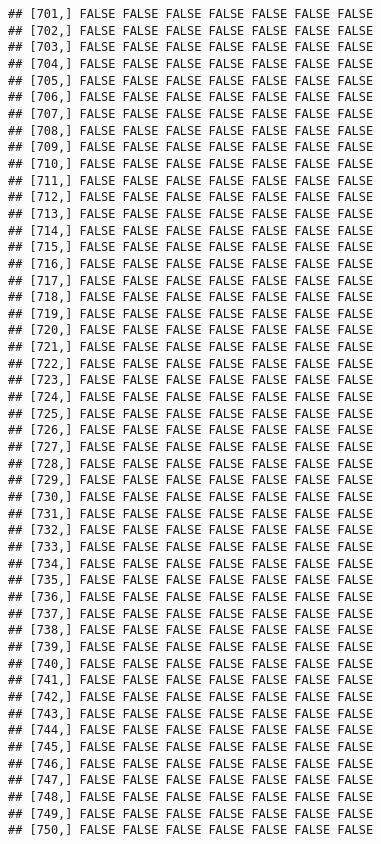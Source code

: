 \documentclass[
]{article}
\begin{document}
\begin{verbatim}
## [701,] FALSE FALSE FALSE FALSE FALSE FALSE FALSE
## [702,] FALSE FALSE FALSE FALSE FALSE FALSE FALSE
## [703,] FALSE FALSE FALSE FALSE FALSE FALSE FALSE
## [704,] FALSE FALSE FALSE FALSE FALSE FALSE FALSE
## [705,] FALSE FALSE FALSE FALSE FALSE FALSE FALSE
## [706,] FALSE FALSE FALSE FALSE FALSE FALSE FALSE
## [707,] FALSE FALSE FALSE FALSE FALSE FALSE FALSE
## [708,] FALSE FALSE FALSE FALSE FALSE FALSE FALSE
## [709,] FALSE FALSE FALSE FALSE FALSE FALSE FALSE
## [710,] FALSE FALSE FALSE FALSE FALSE FALSE FALSE
## [711,] FALSE FALSE FALSE FALSE FALSE FALSE FALSE
## [712,] FALSE FALSE FALSE FALSE FALSE FALSE FALSE
## [713,] FALSE FALSE FALSE FALSE FALSE FALSE FALSE
## [714,] FALSE FALSE FALSE FALSE FALSE FALSE FALSE
## [715,] FALSE FALSE FALSE FALSE FALSE FALSE FALSE
## [716,] FALSE FALSE FALSE FALSE FALSE FALSE FALSE
## [717,] FALSE FALSE FALSE FALSE FALSE FALSE FALSE
## [718,] FALSE FALSE FALSE FALSE FALSE FALSE FALSE
## [719,] FALSE FALSE FALSE FALSE FALSE FALSE FALSE
## [720,] FALSE FALSE FALSE FALSE FALSE FALSE FALSE
## [721,] FALSE FALSE FALSE FALSE FALSE FALSE FALSE
## [722,] FALSE FALSE FALSE FALSE FALSE FALSE FALSE
## [723,] FALSE FALSE FALSE FALSE FALSE FALSE FALSE
## [724,] FALSE FALSE FALSE FALSE FALSE FALSE FALSE
## [725,] FALSE FALSE FALSE FALSE FALSE FALSE FALSE
## [726,] FALSE FALSE FALSE FALSE FALSE FALSE FALSE
## [727,] FALSE FALSE FALSE FALSE FALSE FALSE FALSE
## [728,] FALSE FALSE FALSE FALSE FALSE FALSE FALSE
## [729,] FALSE FALSE FALSE FALSE FALSE FALSE FALSE
## [730,] FALSE FALSE FALSE FALSE FALSE FALSE FALSE
## [731,] FALSE FALSE FALSE FALSE FALSE FALSE FALSE
## [732,] FALSE FALSE FALSE FALSE FALSE FALSE FALSE
## [733,] FALSE FALSE FALSE FALSE FALSE FALSE FALSE
## [734,] FALSE FALSE FALSE FALSE FALSE FALSE FALSE
## [735,] FALSE FALSE FALSE FALSE FALSE FALSE FALSE
## [736,] FALSE FALSE FALSE FALSE FALSE FALSE FALSE
## [737,] FALSE FALSE FALSE FALSE FALSE FALSE FALSE
## [738,] FALSE FALSE FALSE FALSE FALSE FALSE FALSE
## [739,] FALSE FALSE FALSE FALSE FALSE FALSE FALSE
## [740,] FALSE FALSE FALSE FALSE FALSE FALSE FALSE
## [741,] FALSE FALSE FALSE FALSE FALSE FALSE FALSE
## [742,] FALSE FALSE FALSE FALSE FALSE FALSE FALSE
## [743,] FALSE FALSE FALSE FALSE FALSE FALSE FALSE
## [744,] FALSE FALSE FALSE FALSE FALSE FALSE FALSE
## [745,] FALSE FALSE FALSE FALSE FALSE FALSE FALSE
## [746,] FALSE FALSE FALSE FALSE FALSE FALSE FALSE
## [747,] FALSE FALSE FALSE FALSE FALSE FALSE FALSE
## [748,] FALSE FALSE FALSE FALSE FALSE FALSE FALSE
## [749,] FALSE FALSE FALSE FALSE FALSE FALSE FALSE
## [750,] FALSE FALSE FALSE FALSE FALSE FALSE FALSE

\end{verbatim}
\end{document}
